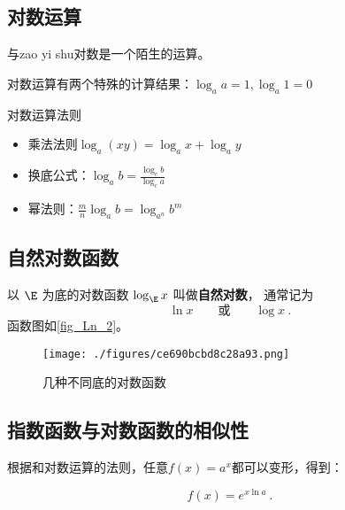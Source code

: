 \begin{issues}
\issueDraft
\end{issues}
\subsection{对数运算}

与zao yi shu对数是一个陌生的运算。

对数运算有两个特殊的计算结果：$\log_a a=1,\log_a1=0$

\begin{theorem}{对数运算法则}
\begin{itemize}
\item 乘法法则$\log_a(xy)=\log_ax+\log_ay$
\item 换底公式：$\displaystyle \log_a b=\frac{\log_cb}{\log_ca}$
\item 幂法则：$\displaystyle \frac{m}{n}\log_a b=\log_{a^n} b^m$
\end{itemize}
\end{theorem}

\subsection{自然对数函数}
以 $\E$ 为底的对数函数 $\log_{\E} x$ 叫做\textbf{自然对数}， 通常记为
\begin{equation}
\ln x \qquad \text{或} \qquad \log x~.
\end{equation}
函数图如\autoref{fig_Ln_2}。
\begin{figure}[ht]
\centering
\texttt{[image: ./figures/ce690bcbd8c28a93.png]}
\caption{几种不同底的对数函数} \label{fig_Ln_2}
\end{figure}


\subsection{指数函数与对数函数的相似性}


根据和对数运算的法则，任意$f(x)=a^x$都可以变形，得到：

\begin{equation}
f(x)=e^{x\ln a}~.
\end{equation}

